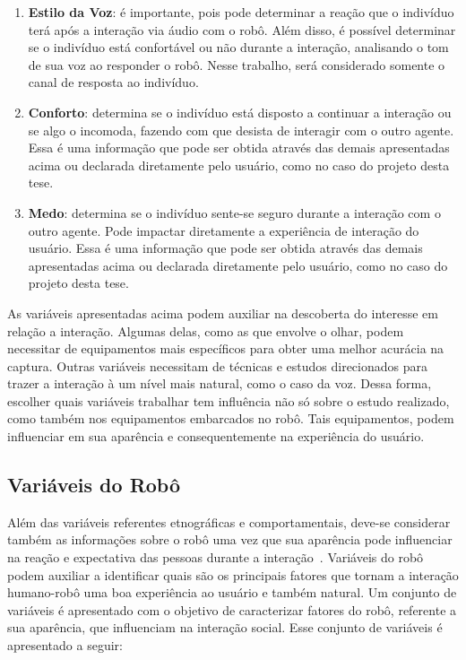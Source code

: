 \begin{enumerate}
	\item \textbf{Estilo da Voz}: é importante, pois pode determinar a reação que o indivíduo terá após a interação via áudio com o robô. Além disso, é possível determinar se o indivíduo está confortável ou não durante a interação, analisando o tom de sua voz ao responder o robô. Nesse trabalho, será considerado somente o canal de resposta ao indivíduo.
    \item \textbf{Conforto}: determina se o indivíduo está disposto a continuar a interação ou se algo o incomoda, fazendo com que desista de interagir com o outro agente. Essa é uma informação que pode ser obtida através das demais apresentadas acima ou declarada diretamente pelo usuário, como no caso do projeto desta tese.
    \item \textbf{Medo}: determina se o indivíduo sente-se seguro durante a interação com o outro agente. Pode impactar diretamente a experiência de interação do usuário. Essa é uma informação que pode ser obtida através das demais apresentadas acima ou declarada diretamente pelo usuário, como no caso do projeto desta tese.
\end{enumerate}

As variáveis apresentadas acima podem auxiliar na descoberta do interesse em relação a interação. Algumas delas, como as que envolve o olhar, podem necessitar de equipamentos mais específicos para obter uma melhor acurácia na captura. Outras variáveis necessitam de técnicas e estudos direcionados para trazer a interação à um nível mais natural, como o caso da voz. Dessa forma, escolher quais variáveis trabalhar tem influência não só sobre o estudo realizado, como também nos equipamentos embarcados no robô. Tais equipamentos, podem influenciar em sua aparência e consequentemente na experiência do usuário.

\subsection{Variáveis do Robô}
\label{sec:variaveisrobo}
Além das variáveis referentes etnográficas e comportamentais, deve-se considerar também as informações sobre o robô uma vez que sua aparência pode influenciar na reação e expectativa das pessoas durante a interação~\cite{hegel:2009}. Variáveis do robô podem auxiliar a identificar quais são os principais fatores que tornam a interação humano-robô uma boa experiência ao usuário e também natural. Um conjunto de variáveis é apresentado com o objetivo de caracterizar fatores do robô, referente a sua aparência, que influenciam na interação social. Esse conjunto de variáveis é apresentado a seguir:

